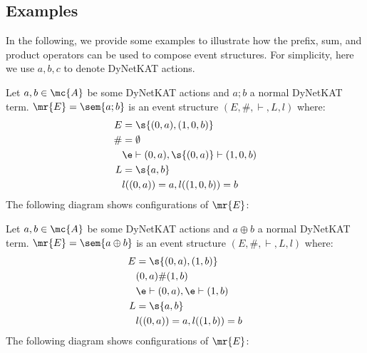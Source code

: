 \subsection{Examples}
In the following, we provide some examples to illustrate
how the prefix, sum, and product operators can be used to 
compose event structures.
For simplicity, here we use $a,b,c$ to denote DyNetKAT actions.

\begin{example}
    Let $a,b\in \mc{A}$ be some DyNetKAT actions and $a;b$ a
    normal DyNetKAT term.
    $\mr{E} = \sem{a;b}$ is an event structure
    $(E,\#,\vdash,L,l)$ where:
    \begin{align*}
        E  & = \s{(0,a),(1,0,b)}                       \\
        \# & = \emptyset                               \\
           & \e \vdash (0,a), \s{(0,a)} \vdash (1,0,b) \\
        L  & = \s{a,b}                                 \\
           & l((0,a)) = a, l((1,0,b)) = b              
    \end{align*}
    The following diagram shows configurations of $\mr{E}$:
    \begin{center}
    \end{center}
\end{example}

\begin{example}
    Let $a,b\in \mc{A}$ be some DyNetKAT actions and $a\oplus b$ a
    normal DyNetKAT term.
    $\mr{E} = \sem{a\oplus b}$ is an event structure
    $(E,\#,\vdash,L,l)$ where:
    \begin{align*}
        E & = \s{(0,a),(1,b)}                \\
          & (0,a) \# (1,b)   \\
          & \e \vdash (0,a), \e \vdash (1,b) \\
        L & = \s{a,b}                        \\
          & l((0,a)) = a, l((1,b)) = b       
    \end{align*}
    The following diagram shows configurations of $\mr{E}$:
    \begin{center}
    \end{center}
\end{example}


